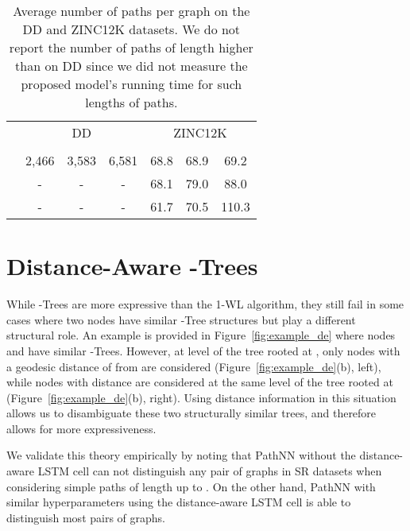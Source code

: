 \documentclass{article}
\theoremstyle{plain}
\theoremstyle{definition}
\theoremstyle{remark}
\begin{document}
\begin{table}[t]
\caption{Average number of paths per graph on the DD and ZINC12K datasets. We do not report the number of paths of length higher than  on DD since we did not measure the proposed model's running time for such lengths of paths.}
\label{tab:n_paths}
\centering
\scriptsize
\renewcommand{\arraystretch}{1.2}
\begin{tabular}{l|ccc|ccc}
\toprule
& \multicolumn{3}{c|}{DD} & \multicolumn{3}{c}{ZINC12K} \\
&  &  &  &  &  &  \\
\midrule
 & 2,466 & 3,583 & 6,581 & 68.8 & 68.9 & 69.2 \\
 & - & - & - & 68.1 & 79.0 & 88.0 \\
 & - & - & - & 61.7 & 70.5 & 110.3 \\
\bottomrule
\end{tabular}
\end{table}

\section{Distance-Aware -Trees}
\label{appendix:distance_enconding}
While -Trees are more expressive than the 1-WL algorithm, they still fail in some cases where two nodes have similar -Tree structures but play a different structural role. An example is provided in Figure~\ref{fig:example_de} where nodes  and  have similar -Trees. However, at level  of the tree rooted at , only nodes with a geodesic distance of  from  are considered (Figure~\ref{fig:example_de}(b), left), while nodes with distance  are considered at the same level of the tree rooted at  (Figure~\ref{fig:example_de}(b), right). Using distance information in this situation allows us to disambiguate these two structurally similar trees, and therefore allows for more expressiveness.

We validate this theory empirically by noting that PathNN without the distance-aware LSTM cell can not distinguish any pair of graphs in SR datasets when considering simple paths of length up to . On the other hand, PathNN with similar hyperparameters using the distance-aware LSTM cell is able to distinguish most pairs of graphs. 

\begin{figure*}[h]
    \centering
    \hfill
    \caption{Example of two nodes with similar -Trees structures that can be distinguished with distance encoding. Node symbols in (b) corresponds to geodesic distance to the root node (squares for distance 1 and diamonds for distance 2).}
    \label{fig:example_de}
\end{figure*}
\end{document}
